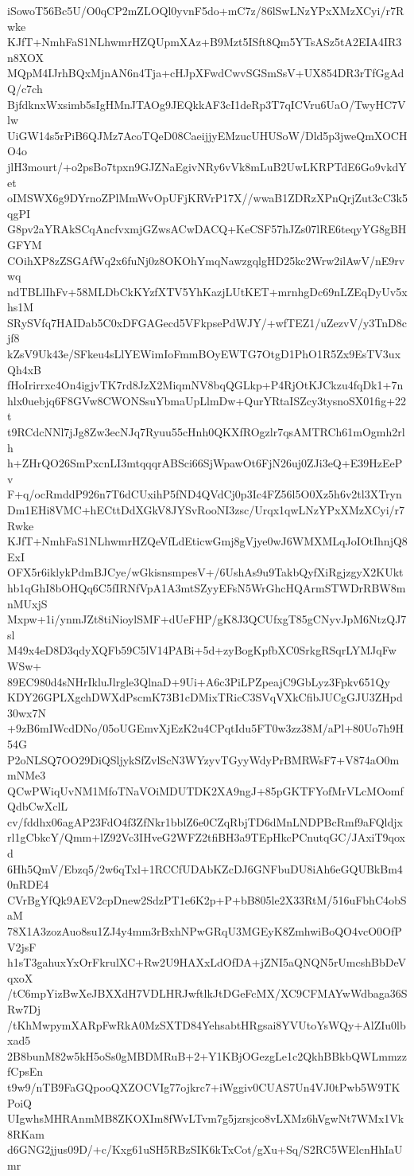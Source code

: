 iSowoT56Bc5U/O0qCP2mZLOQl0yvnF5do+mC7z/86lSwLNzYPxXMzXCyi/r7Rwke
KJfT+NmhFaS1NLhwmrHZQUpmXAz+B9Mzt5ISft8Qm5YTsASz5tA2EIA4IR3n8XOX
MQpM4IJrhBQxMjnAN6n4Tja+cHJpXFwdCwvSGSmSsV+UX854DR3rTfGgAdQ/c7ch
BjfdknxWxsimb5sIgHMnJTAOg9JEQkkAF3cI1deRp3T7qICVru6UaO/TwyHC7Vlw
UiGW14s5rPiB6QJMz7AcoTQeD08CaeijjyEMzucUHUSoW/Dld5p3jweQmXOCHO4o
jlH3mourt/+o2psBo7tpxn9GJZNaEgivNRy6vVk8mLuB2UwLKRPTdE6Go9vkdYet
oIMSWX6g9DYrnoZPlMmWvOpUFjKRVrP17X//wwaB1ZDRzXPnQrjZut3cC3k5qgPI
G8pv2aYRAkSCqAncfvxmjGZwsACwDACQ+KeCSF57hJZs07lRE6teqyYG8gBHGFYM
COihXP8zZSGAfWq2x6fuNj0z8OKOhYmqNawzgqlgHD25kc2Wrw2ilAwV/nE9rvwq
ndTBLlIhFv+58MLDbCkKYzfXTV5YhKazjLUtKET+mrnhgDc69nLZEqDyUv5xhs1M
SRySVfq7HAIDab5C0xDFGAGecd5VFkpsePdWJY/+wfTEZ1/uZezvV/y3TnD8cjf8
kZsV9Uk43e/SFkeu4sLlYEWimIoFmmBOyEWTG7OtgD1PhO1R5Zx9EsTV3uxQh4xB
fHoIrirrxc4On4igjvTK7rd8JzX2MiqmNV8bqQGLkp+P4RjOtKJCkzu4fqDk1+7n
hlx0uebjq6F8GVw8CWONSsuYbmaUpLlmDw+QurYRtaISZcy3tysnoSX01fig+22t
t9RCdcNNl7jJg8Zw3ecNJq7Ryuu55cHnh0QKXfROgzlr7qsAMTRCh61mOgmh2rlh
h+ZHrQO26SmPxcnLI3mtqqqrABSci66SjWpawOt6FjN26uj0ZJi3eQ+E39HzEePv
F+q/ocRmddP926n7T6dCUxihP5fND4QVdCj0p3Ic4FZ56l5O0Xz5h6v2tl3XTryn
Dm1EHi8VMC+hECttDdXGkV8JYSvRooNI3zsc/Urqx1qwLNzYPxXMzXCyi/r7Rwke
KJfT+NmhFaS1NLhwmrHZQeVfLdEticwGmj8gVjye0wJ6WMXMLqJoIOtIhnjQ8ExI
OFX5r6iklykPdmBJCye/wGkisnsmpesV+/6UshAs9u9TakbQyfXiRgjzgyX2KUkt
hb1qGhI8bOHQq6C5fIRNfVpA1A3mtSZyyEFsN5WrGhcHQArmSTWDrRBW8mnMUxjS
Mxpw+1i/ynmJZt8tiNioylSMF+dUeFHP/gK8J3QCUfxgT85gCNyvJpM6NtzQJ7sl
M49x4eD8D3qdyXQFb59C5lV14PABi+5d+zyBogKpfbXC0SrkgRSqrLYMJqFwWSw+
89EC980d4sNHrIkluJlrgle3QlnaD+9Ui+A6c3PiLPZpeajC9GbLyz3Fpkv651Qy
KDY26GPLXgchDWXdPscmK73B1cDMixTRicC3SVqVXkCfibJUCgGJU3ZHpd30wx7N
+9zB6mIWcdDNo/05oUGEmvXjEzK2u4CPqtIdu5FT0w3zz38M/aPl+80Uo7h9H54G
P2oNLSQ7OO29DiQSljykSfZvlScN3WYzyvTGyyWdyPrBMRWsF7+V874aO0mmNMe3
QCwPWiqUvNM1MfoTNaVOiMDUTDK2XA9ngJ+85pGKTFYofMrVLcMOomfQdbCwXclL
cv/fddhx06agAP23FdO4f3ZfNkr1bblZ6e0CZqRbjTD6dMnLNDPBcRmf9aFQldjx
rl1gCbkcY/Qmm+lZ92Vc3IHveG2WFZ2tfiBH3a9TEpHkcPCnutqGC/JAxiT9qoxd
6Hh5QmV/Ebzq5/2w6qTxl+1RCCfUDAbKZcDJ6GNFbuDU8iAh6eGQUBkBm40nRDE4
CVrBgYfQk9AEV2cpDnew2SdzPT1e6K2p+P+bB805le2X33RtM/516uFbhC4obSaM
78X1A3zozAuo8su1ZJ4y4mm3rBxhNPwGRqU3MGEyK8ZmhwiBoQO4vcO0OfPV2jsF
h1sT3gahuxYxOrFkrulXC+Rw2U9HAXxLdOfDA+jZNI5aQNQN5rUmcshBbDeVqxoX
/tC6mpYizBwXeJBXXdH7VDLHRJwftlkJtDGeFcMX/XC9CFMAYwWdbaga36SRw7Dj
/tKhMwpymXARpFwRkA0MzSXTD84YehsabtHRgsai8YVUtoYsWQy+AlZIu0lbxad5
2B8bunM82w5kH5oSs0gMBDMRuB+2+Y1KBjOGezgLe1c2QkhBBkbQWLmmzzfCpsEn
t9w9/nTB9FaGQpooQXZOCVIg77ojkrc7+iWggiv0CUAS7Un4VJ0tPwb5W9TKPoiQ
UIgwhsMHRAnmMB8ZKOXIm8fWvLTvm7g5jzrsjco8vLXMz6hVgwNt7WMx1Vk8RKam
d6GNG2jjus09D/+c/Kxg61uSH5RBzSIK6kTxCot/gXu+Sq/S2RC5WElcnHhIaUmr
